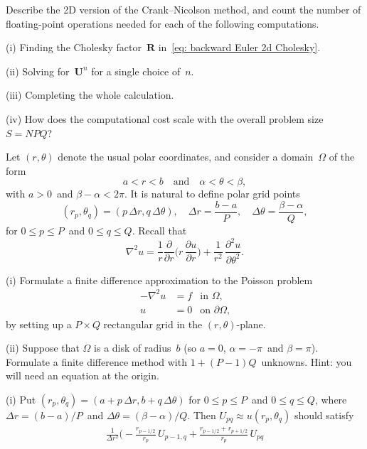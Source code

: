 \begin{Exercises}
\exercise
Describe the 2D version of the Crank--Nicolson method, and count the number of 
floating-point operations needed for each of the following computations.
\begin{description}
\item{(i)} Finding the Cholesky factor~$\boldsymbol{R}$ 
in~\eqref{eq: backward Euler 2d Cholesky}.
\item{(ii)} Solving for~$\boldsymbol{U}^n$ for a single choice of~$n$.
\item{(iii)} Completing the whole calculation.
\item{(iv)} How does the computational cost scale with the overall problem 
size~$S=NPQ$?
\end{description}

\exercise
Let $(r,\theta)$ denote the usual polar coordinates, and consider a
domain~$\Omega$ of the form
\[
a<r<b 
\quad\text{and}\quad 
\alpha<\theta<\beta,
\]
with $a>0$~and $\beta-\alpha<2\pi$. It is natural to define polar
grid points
\[
(r_p,\theta_q)=(p\,\Delta r, q\,\Delta\theta),\quad
\Delta r=\frac{b-a}{P},\quad
\Delta\theta=\frac{\beta-\alpha}{Q},
\]
for $0\le p\le P$~and $0\le q\le Q$.  Recall that
\[
\nabla^2u=\frac{1}{r}\frac{\partial}{\partial r}
        \biggl(r\,\frac{\partial u}{\partial r}\biggr)
        +\frac{1}{r^2}\,\frac{\partial^2u}{\partial\theta^2}.
\]
\begin{description}
\item{(i)} Formulate a finite difference approximation to the Poisson problem
\[
\begin{aligned}
-\nabla^2u&=f&\text{in $\Omega$,}\\
u&=0&\text{on $\partial\Omega$,}
\end{aligned}
\]
by setting up a $P\times Q$ rectangular grid in the
$(r,\theta)$-plane.
\item{(ii)}
Suppose that $\Omega$ is a disk of radius~$b$ (so $a=0$,
$\alpha=-\pi$~and $\beta=\pi$).  Formulate a finite difference
method with $1+(P-1)Q$~unknowns.  Hint: you will need an equation
at the origin.
\end{description}
\begin{ans}
(i)
Put $(r_p,\theta_q)=(a+p\,\Delta r,b+q\,\Delta\theta)$
for $0\le p\le P$~and $0\le q\le Q$, where $\Delta r=(b-a)/P$~and
$\Delta\theta=(\beta-\alpha)/Q$.  Then $U_{pq}\approx u(r_p,\theta_q)$
should satisfy
\begin{multline*}
\frac{1}{\Delta r^2}\biggl(
        -\frac{r_{p-1/2}}{r_p}\,U_{p-1,q}
        +\frac{r_{p-1/2}+r_{p+1/2}}{r_p}\,U_{pq}

\end{multline*}
\end{ans}
\end{Exercises}
